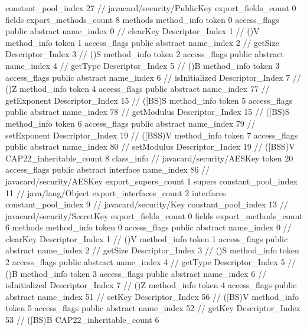 {{{{				constant_pool_index	27		// javacard/security/PublicKey
			}
			export_fields_count	0
			fields {
			}
			export_methods_count	8
			methods {
				method_info {
					token	0
					access_flags	public abstract
					name_index	0		// clearKey
					Descriptor_Index	1		// ()V
				}
				method_info {
					token	1
					access_flags	public abstract
					name_index	2		// getSize
					Descriptor_Index	3		// ()S
				}
				method_info {
					token	2
					access_flags	public abstract
					name_index	4		// getType
					Descriptor_Index	5		// ()B
				}
				method_info {
					token	3
					access_flags	public abstract
					name_index	6		// isInitialized
					Descriptor_Index	7		// ()Z
				}
				method_info {
					token	4
					access_flags	public abstract
					name_index	77		// getExponent
					Descriptor_Index	15		// ([BS)S
				}
				method_info {
					token	5
					access_flags	public abstract
					name_index	78		// getModulus
					Descriptor_Index	15		// ([BS)S
				}
				method_info {
					token	6
					access_flags	public abstract
					name_index	79		// setExponent
					Descriptor_Index	19		// ([BSS)V
				}
				method_info {
					token	7
					access_flags	public abstract
					name_index	80		// setModulus
					Descriptor_Index	19		// ([BSS)V
				}
			}
			CAP22_inheritable_count	8
		}
		class_info {		// javacard/security/AESKey
			token	20
			access_flags	public abstract interface
			name_index	86		// javacard/security/AESKey
			export_supers_count	1
			supers {
				constant_pool_index	11		// java/lang/Object
			}
			export_interfaces_count	2
			interfaces {
				constant_pool_index	9		// javacard/security/Key
				constant_pool_index	13		// javacard/security/SecretKey
			}
			export_fields_count	0
			fields {
			}
			export_methods_count	6
			methods {
				method_info {
					token	0
					access_flags	public abstract
					name_index	0		// clearKey
					Descriptor_Index	1		// ()V
				}
				method_info {
					token	1
					access_flags	public abstract
					name_index	2		// getSize
					Descriptor_Index	3		// ()S
				}
				method_info {
					token	2
					access_flags	public abstract
					name_index	4		// getType
					Descriptor_Index	5		// ()B
				}
				method_info {
					token	3
					access_flags	public abstract
					name_index	6		// isInitialized
					Descriptor_Index	7		// ()Z
				}
				method_info {
					token	4
					access_flags	public abstract
					name_index	51		// setKey
					Descriptor_Index	56		// ([BS)V
				}
				method_info {
					token	5
					access_flags	public abstract
					name_index	52		// getKey
					Descriptor_Index	53		// ([BS)B
				}
			}
			CAP22_inheritable_count	6
}}}
